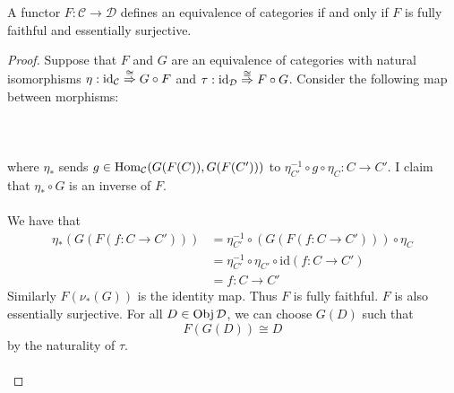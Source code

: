 \documentclass[a4paper]{article}
\begin{document}
\begin{prp}{}{} A functor $F:\mathcal{C}\to\mathcal{D}$ defines an equivalence of categories if and only if $F$ is fully faithful and essentially surjective. \tcbline
\begin{proof}
Suppose that $F$ and $G$ are an equivalence of categories with natural isomorphisms $\eta:\text{id}_{\mathcal{C}}\overset{\cong}{\Rightarrow}G\circ F$ and $
\tau:\text{id}_{\mathcal{D}}\overset{\cong}{\Rightarrow}F\circ G$. Consider the following map between morphisms: \\~\\
\\~\\
where $\eta_\ast$ sends $g\in\operatorname{Hom}_{\mathcal{C}}(G(F(C)),G(F(C')))$ to $\eta_{C'}^{-1}\circ g\circ\eta_C:C\to C'$. I claim that $\eta_\ast\circ G$ is an inverse of $F$. \\~\\
We have that 
\begin{align*}
\eta_\ast(G(F(f:C\to C')))&=\eta_{C'}^{-1}\circ(G(F(f:C\to C')))\circ\eta_C\\
&=\eta_{C'}^{-1}\circ\eta_{C'}\circ\text{id}(f:C\to C')\tag{$\nu$ is natural}\\
&=f:C\to C'
\end{align*}
Similarly $F(\nu_\ast(G))$ is the identity map. Thus $F$ is fully faithful. $F$ is also essentially surjective. For all $D\in\operatorname{Obj}\mathcal{D}$, we can choose $G(D)$ such that $$F(G(D))\cong D$$ by the naturality of $\tau$. \\~\\


\end{proof}
\end{prp}
\end{document}
